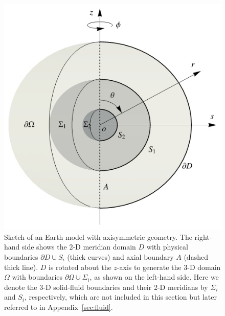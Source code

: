 \documentclass[extra]{gji}
\begin{document}
\begin{figure}
  \centering
  \includegraphics[width=.45\textwidth]{fig/theory/crd.pdf}
  \caption{Sketch of an Earth model with axisymmetric geometry. 
  The right-hand side shows the 2-D meridian domain $D$ with 
  physical boundaries $\partial D\cup S_i$ (thick curves) and 
  axial boundary $A$ (dashed thick line). $D$ is rotated about 
  the $z$-axis to generate the 3-D domain $\Omega$ with boundaries 
  $\partial\Omega\cup\Sigma_i$, as shown on the left-hand
  side. Here we denote the 3-D solid-fluid boundaries and 
  their 2-D meridians by $\Sigma_i$ and $S_i$, respectively, 
  which are not included in this section but later referred to in
  Appendix~\ref{sec:fluid}.}
\label{fig:crd}
\end{figure}

\end{document}
